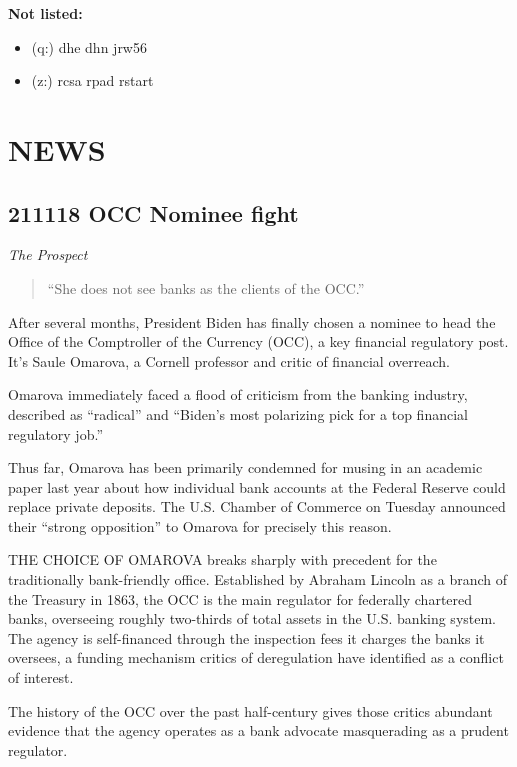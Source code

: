 \documentclass[
]{book}
\providecommand{\tightlist}{%
  \setlength{\itemsep}{0pt}\setlength{\parskip}{0pt}}
\begin{document}
\textbf{Not listed:}

\begin{itemize}
\tightlist
\item
  (q:) dhe dhn jrw56
\item
  (z:) rcsa rpad rstart
\end{itemize}

\hypertarget{news}{%
\chapter{NEWS}\label{news}}

\hypertarget{occ-nominee-fight}{%
\section{211118 OCC Nominee fight}\label{occ-nominee-fight}}

\emph{The Prospect}

\begin{quote}
``She does not see banks as the clients of the OCC.''
\end{quote}

After several months, President Biden has finally chosen a nominee to head the Office of the Comptroller of the Currency (OCC), a key financial regulatory post. It's Saule Omarova, a Cornell professor and critic of financial overreach.

Omarova immediately faced a flood of criticism from the banking industry, described as ``radical'' and ``Biden's most polarizing pick for a top financial regulatory job.''

Thus far, Omarova has been primarily condemned for musing in an academic paper last year about how individual bank accounts at the Federal Reserve could replace private deposits. The U.S. Chamber of Commerce on Tuesday announced their ``strong opposition'' to Omarova for precisely this reason.

THE CHOICE OF OMAROVA breaks sharply with precedent for the traditionally bank-friendly office. Established by Abraham Lincoln as a branch of the Treasury in 1863, the OCC is the main regulator for federally chartered banks, overseeing roughly two-thirds of total assets in the U.S. banking system. The agency is self-financed through the inspection fees it charges the banks it oversees, a funding mechanism critics of deregulation have identified as a conflict of interest.

The history of the OCC over the past half-century gives those critics abundant evidence that the agency operates as a bank advocate masquerading as a prudent regulator.
\end{document}
